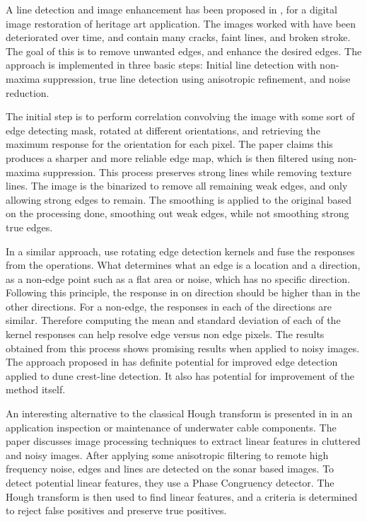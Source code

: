 A line detection and image enhancement has been proposed in \cite{Robust_Faint_Line_Detection_Enhancement_Algorithm}, for a digital image restoration of heritage art application. The images worked with have been deteriorated over time, and contain many cracks, faint lines, and broken stroke. The goal of this is to remove unwanted edges, and enhance the desired edges. The approach is implemented in three basic steps: Initial line detection with non-maxima suppression, true line detection using anisotropic refinement, and noise reduction.

The initial step is to perform correlation convolving the image with some sort of edge detecting mask, rotated at different orientations, and retrieving the maximum response for the orientation	for each pixel. The paper claims this produces a sharper and more reliable edge map, which is then filtered using non-maxima suppression. This process preserves strong lines while removing texture lines. The image is the binarized to remove all remaining weak edges, and only allowing strong edges to remain. The smoothing is applied to the original based on the processing done, smoothing out weak edges, while not smoothing strong true edges.

In a similar approach, \cite{Image_Edge_detection_Rotating_Kernel_Transformation} use rotating edge detection kernels and fuse the responses from the operations. What determines what an edge is a location and a direction, as a non-edge point such as a flat area or noise, which has no specific direction. Following this principle, the response in on direction should be higher than in the other directions. For a non-edge, the	responses in each of the directions are similar. Therefore computing the mean and standard deviation of each of the kernel responses can help resolve edge versus non edge pixels. The results obtained from this process shows promising results when applied to noisy images. The approach proposed in \cite{Image_Edge_detection_Rotating_Kernel_Transformation} has definite potential for improved edge detection applied to dune crest-line detection. It also has potential for improvement of the method itself.

An interesting alternative to the classical Hough transform is presented in \cite{Automated_cable_tracking_sonar_imagery} in an application inspection or maintenance of underwater cable components. The paper discusses image processing techniques to extract linear features in cluttered and noisy images. After applying some anisotropic filtering to remote high frequency noise, edges and lines are detected on the sonar based images. To detect potential linear features, they use a Phase Congruency detector. The Hough transform is then used to find linear features, and a criteria is determined to reject false positives and preserve true positives.

